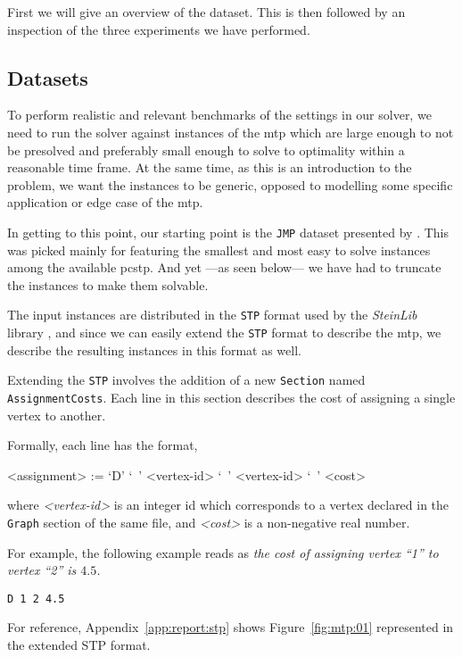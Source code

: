 First we will give an overview of the dataset. This is then
followed by an inspection of the three experiments we have
 performed.
 \subsection{Datasets}
 To perform realistic and relevant benchmarks of the settings in our solver, we need to run the solver
 against instances of the \gls{mtp} which are large enough to not be presolved and preferably small
 enough to solve to optimality within a reasonable time frame. At the same time, as this is an introduction
 to the problem, we want the instances to be generic, opposed to modelling some specific application or
 edge case of the \gls{mtp}.

 In getting to this point, our starting point is the \texttt{JMP} dataset presented by 
 \citet{Johnson:2000:PCS:338219.338637}. This was picked mainly for featuring the smallest
 and most easy to solve instances among the available \gls{pcstp}.
 And yet ---as seen below--- we have had to truncate the instances to make them solvable.

 The input instances are distributed in the \texttt{STP} format used by the \textit{SteinLib}
 library \citep{koch2001steinlib}, and since we can easily extend the \texttt{STP} format
 to describe the \gls{mtp}, we describe the resulting instances in this format as well.

 Extending the \texttt{STP} involves the addition of a new
 \texttt{Section} named \texttt{AssignmentCosts}. Each line
 in this section describes the cost of assigning a single vertex to another.

 Formally, each line has the format,
 \begin{grammar}
   <assignment> := `D' `\ ' <vertex-id> `\ ' <vertex-id> `\ ' <cost>
 \end{grammar}
 where \textit{<vertex-id>} is an integer id which corresponds to a vertex declared in the \texttt{Graph}
 section of the same file, and \textit{<cost>} is a non-negative real number.

 For example, the following example reads as \textit{the cost of assigning vertex ``1'' to vertex ``2'' is $4.5$.}
\begin{verbatim}
D 1 2 4.5
\end{verbatim}
 
 For reference, Appendix~\ref{app:report:stp} shows Figure~\ref{fig:mtp:01}
 represented in the extended STP format.

